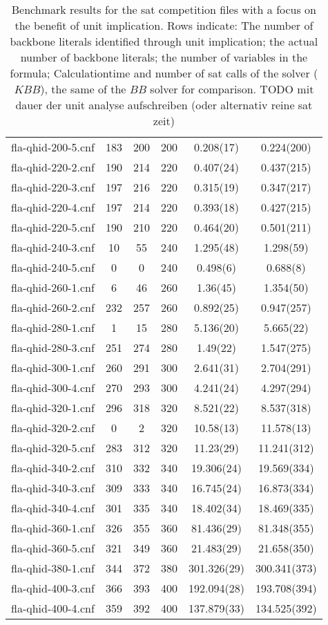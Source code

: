 \begin{table}
\begin{tabular}{l| c c c c c }
fla-qhid-200-5.cnf & 183 & 200 & 200 & 0.208(17) & 0.224(200) \\
fla-qhid-220-2.cnf & 190 & 214 & 220 & 0.407(24) & 0.437(215) \\
fla-qhid-220-3.cnf & 197 & 216 & 220 & 0.315(19) & 0.347(217) \\
fla-qhid-220-4.cnf & 197 & 214 & 220 & 0.393(18) & 0.427(215) \\
fla-qhid-220-5.cnf & 190 & 210 & 220 & 0.464(20) & 0.501(211) \\
fla-qhid-240-3.cnf & 10 & 55 & 240 & 1.295(48) & 1.298(59) \\
fla-qhid-240-5.cnf & 0 & 0 & 240 & 0.498(6) & 0.688(8) \\
fla-qhid-260-1.cnf & 6 & 46 & 260 & 1.36(45) & 1.354(50) \\
\fi
fla-qhid-260-2.cnf & 232 & 257 & 260 & 0.892(25) & 0.947(257) \\
fla-qhid-280-1.cnf & 1 & 15 & 280 & 5.136(20) & 5.665(22) \\
fla-qhid-280-3.cnf & 251 & 274 & 280 & 1.49(22) & 1.547(275) \\
fla-qhid-300-1.cnf & 260 & 291 & 300 & 2.641(31) & 2.704(291) \\
fla-qhid-300-4.cnf & 270 & 293 & 300 & 4.241(24) & 4.297(294) \\
fla-qhid-320-1.cnf & 296 & 318 & 320 & 8.521(22) & 8.537(318) \\
fla-qhid-320-2.cnf & 0 & 2 & 320 & 10.58(13) & 11.578(13) \\
fla-qhid-320-5.cnf & 283 & 312 & 320 & 11.23(29) & 11.241(312) \\
fla-qhid-340-2.cnf & 310 & 332 & 340 & 19.306(24) & 19.569(334) \\
fla-qhid-340-3.cnf & 309 & 333 & 340 & 16.745(24) & 16.873(334) \\
fla-qhid-340-4.cnf & 301 & 335 & 340 & 18.402(34) & 18.469(335) \\
fla-qhid-360-1.cnf & 326 & 355 & 360 & 81.436(29) & 81.348(355) \\
fla-qhid-360-5.cnf & 321 & 349 & 360 & 21.483(29) & 21.658(350) \\
fla-qhid-380-1.cnf & 344 & 372 & 380 & 301.326(29) & 300.341(373) \\
fla-qhid-400-3.cnf & 366 & 393 & 400 & 192.094(28) & 193.708(394) \\
fla-qhid-400-4.cnf & 359 & 392 & 400 & 137.879(33) & 134.525(392) \\
\hline
\end{tabular}
\caption{Benchmark results for the sat competition files with a focus on the benefit of unit implication.
Rows indicate: The number of backbone literals identified through unit implication; the actual number of backbone literals; the number of variables in the formula; Calculationtime and number of sat calls of the solver ($KBB$), the same of the $BB$ solver for comparison. TODO mit dauer der unit analyse aufschreiben (oder alternativ reine sat zeit)}
\end{table}


